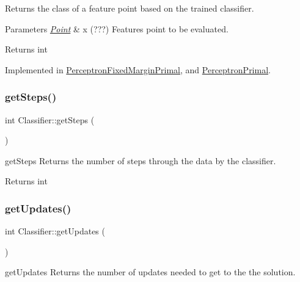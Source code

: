 Returns the class of a feature point based on the trained classifier. 


\begin{DoxyParams}{Parameters}
{\em \hyperlink{class_point}{Point}} & x (???) Features point to be evaluated. \\
\hline
\end{DoxyParams}
\begin{DoxyReturn}{Returns}
int 
\end{DoxyReturn}


Implemented in \hyperlink{class_perceptron_fixed_margin_primal_af72c3dde96f1f1b803c7b522b5c1cc0f}{Perceptron\+Fixed\+Margin\+Primal}, and \hyperlink{class_perceptron_primal_ac8ce9ceffe2b35b5386e5367fb419b3b}{Perceptron\+Primal}.

\mbox{\label{class_classifier_a1fb3e4dfd80c154e89603c8fa1b11b76}} 
\subsubsection{\texorpdfstring{get\+Steps()}{getSteps()}}
{\footnotesize\ttfamily int Classifier\+::get\+Steps (\begin{DoxyParamCaption}{ }\end{DoxyParamCaption})}



get\+Steps Returns the number of steps through the data by the classifier. 

\begin{DoxyReturn}{Returns}
int 
\end{DoxyReturn}
\mbox{\label{class_classifier_a738c2fbed982db6cad02062edcc037e4}} 
\subsubsection{\texorpdfstring{get\+Updates()}{getUpdates()}}
{\footnotesize\ttfamily int Classifier\+::get\+Updates (\begin{DoxyParamCaption}{ }\end{DoxyParamCaption})}



get\+Updates Returns the number of updates needed to get to the the solution. 

